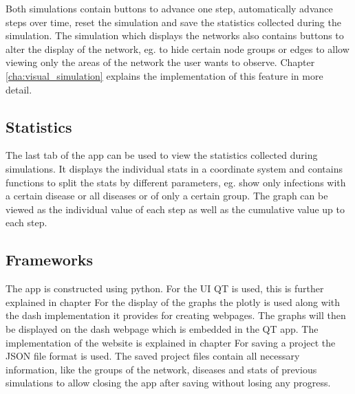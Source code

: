 Both simulations contain buttons to advance one step, automatically advance steps over time,
reset the simulation and save the statistics collected during the simulation. The simulation
which displays the networks also contains buttons to alter the display of the network, eg. to hide
certain node groups or edges to allow viewing only the areas of the network the user wants to observe.
Chapter \ref{cha:visual_simulation} explains the implementation of this feature in more detail.

\subsection{Statistics}
The last tab of the app can be used to view the statistics collected during simulations.
It displays the individual stats in a coordinate system and contains functions to split
the stats by different parameters, eg. show only infections with a certain disease or all
diseases or of only a certain group. The graph can be viewed as the individual value of each
step as well as the cumulative value up to each step.

\subsection{Frameworks}
The app is constructed using python. For the UI QT \cite{qt} is used, this is further explained
in chapter %
For the display of the graphs the plotly \cite{plotly} is used along with the dash implementation
it provides for creating webpages. The graphs will then be displayed on the dash webpage
which is embedded in the QT app. The implementation of the website is explained in chapter %
For saving a project the JSON file format is used. The saved project files contain all 
necessary information, like the groups of the network, diseases and stats of previous simulations
to allow closing the app after saving without losing any progress.
